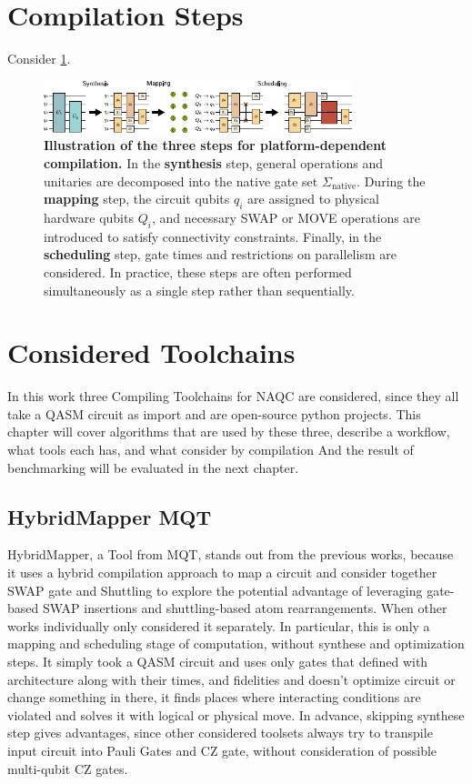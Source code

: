\section{Compilation Steps}
Consider \ref{fig:compilation_steps}.
\begin{figure}[htbp]
  \centering
    \includegraphics[width=0.8\textwidth]{figures/compilation_steps.pdf}
    \caption{\textbf{Illustration of the three steps for platform-dependent compilation.} In the \textbf{synthesis} step, general operations and unitaries are decomposed into the native gate set $\Sigma_{\mathrm{native}}$.
  During the \textbf{mapping} step, the circuit qubits $q_{i}$ are assigned to physical hardware qubits $Q_{i}$, and necessary SWAP or MOVE operations are introduced to satisfy connectivity constraints.
  Finally, in the \textbf{scheduling} step, gate times and restrictions on parallelism are considered.
  In practice, these steps are often performed simultaneously as a single step rather than sequentially. \parencite{Schmid_2024_NeutralAtomBasics}}
    \label{fig:compilation_steps}
\end{figure}

\section{Considered Toolchains}
In this work three Compiling Toolchains for \ac{NAQC} are considered, 
since they all take a QASM circuit as import and are open-source python projects.
This chapter will cover algorithms that are used by these three, 
describe a workflow, what tools each has, and what consider by compilation
And the result of benchmarking will be evaluated in the next chapter.

\subsection{HybridMapper MQT}
HybridMapper, a Tool from \ac{MQT}, stands out from the previous works, 
because it uses a hybrid compilation approach to map a circuit 
and consider together SWAP gate and Shuttling to explore the potential advantage of leveraging gate-based SWAP insertions 
and shuttling-based atom rearrangements.
When other works individually only considered it separately.
In particular, this is only a mapping and scheduling stage of computation, without synthese and optimization steps.
It simply took a QASM circuit and uses only gates that defined with architecture along with their times, and fidelities 
and doesn't optimize circuit or change something in there, it finds places where interacting conditions are violated 
and solves it with logical or physical move. 
In advance, skipping synthese step gives advantages, 
since other considered toolsets always try to transpile input circuit into Pauli Gates and CZ gate, without consideration of possible multi-qubit CZ gates.

